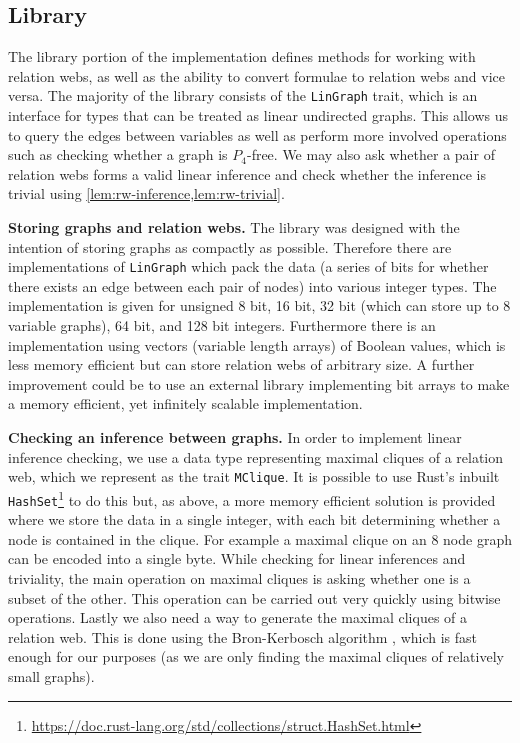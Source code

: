 \documentclass[a4paper, UKenglish, cleveref]{lipics-v2021}
\begin{document}
\subsection{Library}
\label{sec:library}

The library portion of the implementation defines methods for working with relation webs, as well as the ability to convert formulae to relation webs and vice versa. The majority of the library consists of the \texttt{LinGraph} trait, which is an interface for types that can be treated as linear undirected graphs. This allows us to query the edges between variables as well as perform more involved operations such as checking whether a graph is \(P_4\)-free.
We may also ask whether a pair of relation webs forms a valid linear inference and check whether the inference is trivial using \cref{lem:rw-inference,lem:rw-trivial}.

\smallskip

\textbf{Storing graphs and relation webs.}
The library was designed with the intention of storing graphs as compactly as possible.
 Therefore there are implementations of \texttt{LinGraph} which pack the data (a series of bits for whether there exists an edge between each pair of nodes) into various integer types. The implementation is given for unsigned 8 bit, 16 bit, 32 bit (which can store up to 8 variable graphs), 64 bit, and 128 bit integers. Furthermore there is an implementation using vectors (variable length arrays) of Boolean values, which is less memory efficient but can store relation webs of arbitrary size. A further improvement could be to use an external library implementing bit arrays to make a memory efficient, yet infinitely scalable implementation.

\smallskip

\textbf{Checking an inference between graphs.}
In order to implement linear inference checking, we use a data type representing maximal cliques of a relation web, which we represent as the trait \texttt{MClique}. It is possible to use Rust's inbuilt \texttt{HashSet}\footnote{\url{https://doc.rust-lang.org/std/collections/struct.HashSet.html}} to do this but, as above, a more memory efficient solution is provided where we store the data in a single integer, with each bit determining whether a node is contained in the clique. For example a maximal clique on an 8 node graph can be encoded into a single byte. While checking for linear inferences and triviality, the main operation on maximal cliques is asking whether one is a subset of the other. This operation can be carried out very quickly using bitwise operations. Lastly we also need a way to generate the maximal cliques of a relation web. This is done using the Bron-Kerbosch algorithm \cite{BroKer73:finding-all-maxcliques}, which is fast enough for our purposes (as we are only finding the maximal cliques of relatively small graphs).
\end{document}
